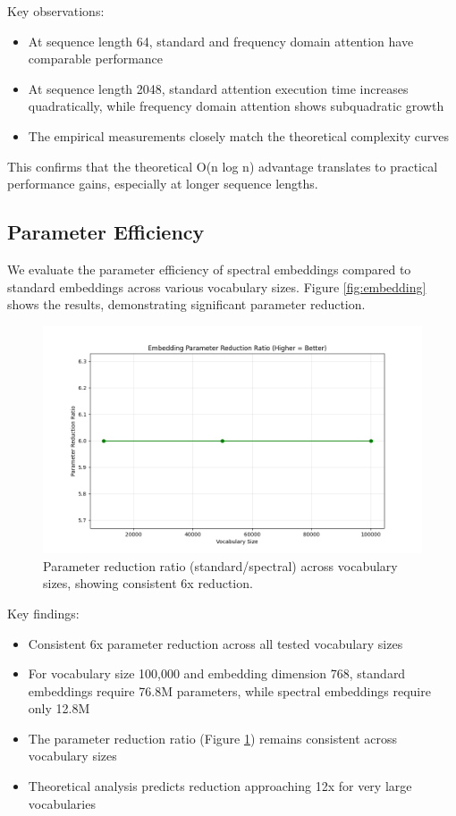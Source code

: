 \documentclass[10pt,twocolumn,letterpaper]{article}
\begin{document}
Key observations:

\begin{itemize}
    \item At sequence length 64, standard and frequency domain attention have comparable performance
    \item At sequence length 2048, standard attention execution time increases quadratically, while frequency domain attention shows subquadratic growth
    \item The empirical measurements closely match the theoretical complexity curves
\end{itemize}

This confirms that the theoretical O(n log n) advantage translates to practical performance gains, especially at longer sequence lengths.

\subsection{Parameter Efficiency}

We evaluate the parameter efficiency of spectral embeddings compared to standard embeddings across various vocabulary sizes. Figure \ref{fig:embedding} shows the results, demonstrating significant parameter reduction.

\begin{figure}[t]
    \centering
    \includegraphics[width=0.9\linewidth]{report_assets/parameter_ratio.png}
    \caption{Parameter reduction ratio (standard/spectral) across vocabulary sizes, showing consistent 6x reduction.}
    \label{fig:ratio}
\end{figure}

Key findings:

\begin{itemize}
    \item Consistent 6x parameter reduction across all tested vocabulary sizes
    \item For vocabulary size 100,000 and embedding dimension 768, standard embeddings require 76.8M parameters, while spectral embeddings require only 12.8M
    \item The parameter reduction ratio (Figure \ref{fig:ratio}) remains consistent across vocabulary sizes
    \item Theoretical analysis predicts reduction approaching 12x for very large vocabularies
\end{itemize}
\end{document}
